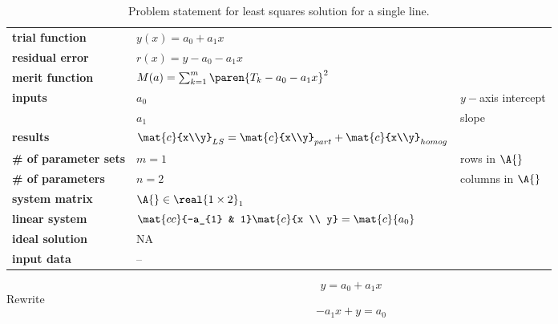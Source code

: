   \begin{table}[h]  %
    \caption{Problem statement for least squares solution for a single line.}
    \begin{center}
      \begin{tabular}{lll}
        \bf{trial function} & $y(x) = a_{0} + a_{1} x$ \\
        \bf{residual error} & $r(x) = y - a_{0} - a_{1} x$ \\
        \bf{merit function} & $M(a) = \sum_{k=1}^{m}\paren{T_{k} - a_{0} - a_{1} x}^{2}$\\
        \bf{inputs}         & $a_{0}$ & $y-$axis intercept \\
                            & $a_{1}$ & slope \\
        \bf{results}        & $\mat{c}{x\\y}_{LS} = \mat{c}{x\\y}_{part} + \mat{c}{x\\y}_{homog}$   \\
        \bf{\# of parameter sets} & $m = 1$ & rows in $\A{}$ \\
        \bf{\# of parameters}   & $n = 2$ & columns in $\A{}$ \\
        \bf{system matrix}  & $\A{} \in \real{1 \times 2}_{1}$ \\
        \bf{linear system}  & $\mat{cc}{-a_{1} & 1} 
                               \mat{c}{x \\ y} = 
                               \mat{c}{a_{0}}$ \\
        \bf{ideal solution} & NA \\
        \bf{input data}     & --
      \end{tabular}
    \end{center}
  \label{tab:bevington inputs}
  \end{table}%

  \begin{equation}   %
      y = a_{0} + a_{1} x
   \label{eq:myline}
  \end{equation}
Rewrite
  \begin{equation*}   %
      -a_{1} x + y = a_{0}
  \end{equation*}

